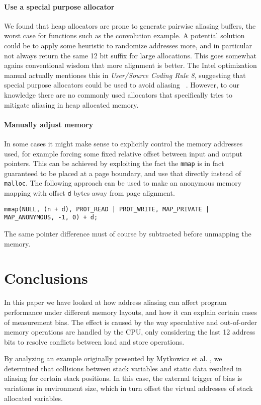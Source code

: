 \documentclass[a4paper,10pt,twocolumn,twoside]{article}
\begin{document}
{\paragraph{Use a special purpose allocator}
We found that heap allocators are prone to generate pairwise aliasing buffers, the worst case for functions such as the convolution example.
A potential solution could be to apply some heuristic to randomize addresses more, and in particular not always return the same 12 bit suffix for large allocations.
This goes somewhat agains conventional wisdom that more alignment is better.
The Intel optimization manual actually mentiones this in \emph{User/Source Coding Rule 8}, suggesting that special purpose allocators could be used to avoid aliasing ~\cite{OptimizationManual}.
However, to our knowledge there are no commonly used allocators that specifically tries to mitigate aliasing in heap allocated memory.

\paragraph{Manually adjust memory}
In some cases it might make sense to explicitly control the memory addresses used, for example forcing some fixed relative offset between input and output pointers.
This can be achieved by exploiting the fact the \texttt{mmap} is in fact guaranteed to be placed at a page boundary, and use that directly instead of \texttt{malloc}.
The following approach can be used to make an anonymous memory mapping with offset \texttt{d} bytes away from page alignment.
\begin{lstlisting}[breaklines=true]
    mmap(NULL, (n + d), PROT_READ | PROT_WRITE, MAP_PRIVATE | MAP_ANONYMOUS, -1, 0) + d;
\end{lstlisting}
The same pointer difference must of course by subtracted before unmapping the memory.


\section{Conclusions}
In this paper we have looked at how address aliasing can affect program performance under different memory layouts, and how it can explain certain cases of measurement bias. 
The effect is caused by the way speculative and out-of-order memory operations are handled by the CPU, only considering the last 12 address bits to resolve conflicts between load and store operations.

By analyzing an example originally presented by Mytkowicz et al. \cite{Mytkowicz:2009:WrongData}, we determined that collisions between stack variables and static data resulted in aliasing for certain stack positions.
In this case, the external trigger of bias is variations in environment size, which in turn offset the virtual addresses of stack allocated variables.

}
\end{document}
